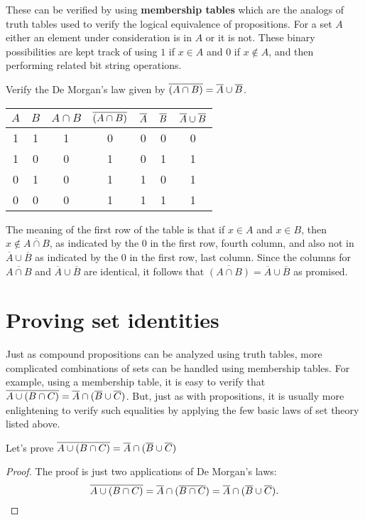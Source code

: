 \vspace*{0.25cm}
These can be verified by using { \bfseries membership tables} which are the analogs of truth
tables used to verify the logical equivalence of propositions. For a set $A$ either an element 
under consideration
is in $A$ or it is not. These binary possibilities are kept track of using $1$ if 
$x\in A$ and $0$ if $x\not\in A$,
and then performing related bit string operations. 


\begin{exmp}
Verify the De Morgan's law given by $\overline{(A\cap B)}=\overline{A}\cup \overline{B}$.
\begin{table}
\centering
\begin{tabular}{cc|c|c|c|c|c}
$A$ & $B$ & $A\cap B$ & $\overline{(A\cap B)}$ & $\overline{A}$ & $\overline{B}$ & $\overline{A} \cup \overline{B}$ \\
\hline
1   &  1   &  1  &  0 & 0 & 0 & 0 \\
1   &  0   &  0  &  1 & 0 & 1 & 1 \\
0   &  1   &  0  &  1 & 1 & 0 & 1 \\
0   &  0   &  0  &  1 & 1 & 1 & 1 
\end{tabular}
\end{table}

The meaning of the first row of the table  is that if $x\in A$ and $x\in B$, then $x\not\in\overline{A\cap B}$,
as indicated by the $0$ in the first row, fourth column, and also not in $\overline{A}\cup\overline{B}$
as indicated by the $0$ in the first row, last column. Since the columns for  $\overline{A\cap B}$
and $\overline{A}\cup\overline{B}$ are identical, it follows that 
$\overline{(A\cap B)}=\overline{A}\cup \overline{B}$ as promised.
\end{exmp} 


\section{Proving set identities}
Just as compound propositions can be analyzed using truth tables, more complicated combinations of
sets can be handled using membership tables.  For example, using a membership table, it is easy
to verify that $\overline{A\cup(B\cap C)} = \overline{A}\cap({\overline{B}\cup\overline{C}})$. But, just as with 
propositions, it is usually more enlightening to verify such equalities by applying the few
basic laws of set theory listed above.

\begin{exmp}
Let's prove $\overline{A\cup(B\cap C)} = \overline{A}\cap({\overline{B}\cup\overline{C}})$
\begin{proof}
 The proof is just two applications of De Morgan's laws:
\[
  \overline{A\cup(B\cap C)} = \overline{A} \cap (\overline{B\cap C})  = \overline{A} \cap (\overline{B}\cup\overline{ C}).
\]
\end{proof}
\end{exmp}



